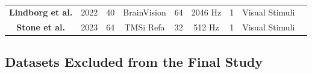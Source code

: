 \begin{table}[ht]
{\begin{tabular}{c|cccccccc}
\rule{0pt}{25pt}\textbf{Lindborg et al. \cite{lindborg2023semantic}} & 2022 & 40 & BrainVision & 64 & 2046 Hz & 1 & Visual Stimuli\\

\rowcolor{Gray}
\rule{0pt}{25pt}\textbf{Stone et al. \cite{stone2023understanding}} & 2023 & 64 & TMSi Refa & 32 & 512 Hz & 1 & Visual Stimuli\\


\hline
\end{tabular}
}
\end{table}


\subsection{Datasets Excluded from the Final Study}
\label{sec:Solution Approach:Survey Open Datasets: Potential Datasets Excluded from the Final Study}
